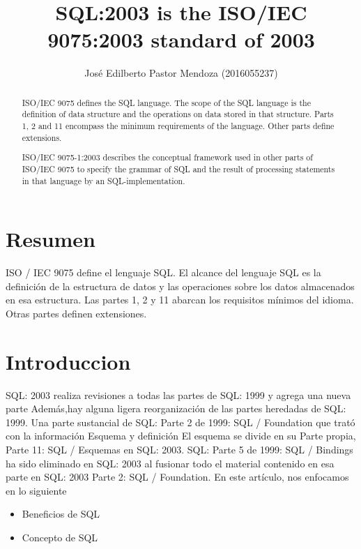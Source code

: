 \documentclass[preprint,12pt]{elsarticle}
\begin{document}
	
	\begin{frontmatter}

		\title{\huge SQL:2003 is the ISO/IEC 9075:2003 standard of 2003}
		
		\author{José Edilberto Pastor Mendoza               (2016055237)}
		
		\address{Tacna, Perú}
		
		\begin{abstract}
ISO/IEC 9075 defines the SQL language. The scope of the SQL language is the definition of data structure and the operations on data stored in that structure. Parts 1, 2 and 11 encompass the minimum requirements of the language. Other parts define extensions.

ISO/IEC 9075-1:2003 describes the conceptual framework used in other parts of ISO/IEC 9075 to specify the grammar of SQL and the result of processing statements in that language by an SQL-implementation.


		\end{abstract}
\end{frontmatter}
	
	\section{Resumen}

ISO / IEC 9075 define el lenguaje SQL. El alcance del lenguaje SQL es la definición de la estructura de datos y las operaciones sobre los datos almacenados en esa estructura. Las partes 1, 2 y 11 abarcan los requisitos mínimos del idioma. Otras partes definen extensiones.


	
\section{Introduccion}
SQL: 2003 realiza revisiones a todas las partes de SQL: 1999
y agrega una nueva parte Además,hay
alguna ligera reorganización de las partes heredadas de
SQL: 1999. Una parte sustancial de SQL: Parte 2 de 1999:
SQL / Foundation que trató con la información
Esquema y definición El esquema se divide en su
Parte propia, Parte 11: SQL / Esquemas en SQL: 2003.
SQL: Parte 5 de 1999: SQL / Bindings ha sido
eliminado en SQL: 2003 al fusionar todo el material
contenido en esa parte en SQL: 2003 Parte 2:
SQL / Foundation.
En este artículo, nos enfocamos en lo siguiente
\begin{itemize}
		\item Beneficios de SQL 
		\item Concepto de SQL
	\end{itemize}
\end{document}
